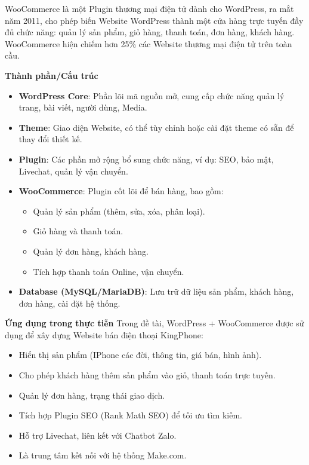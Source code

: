WooCommerce là một Plugin thương mại điện tử dành cho WordPress, ra mắt năm 2011, cho phép biến Website WordPress thành một cửa hàng trực tuyến đầy đủ chức năng: quản lý sản phẩm, giỏ hàng, thanh toán, đơn hàng, khách hàng. WooCommerce hiện chiếm hơn 25\% các Website thương mại điện tử trên toàn cầu.

\textbf{Thành phần/Cấu trúc}
\begin{itemize}
    \item \textbf{WordPress Core}: Phần lõi mã nguồn mở, cung cấp chức năng quản lý trang, bài viết, người dùng, Media.
    \item \textbf{Theme}: Giao diện Website, có thể tùy chỉnh hoặc cài đặt theme có sẵn để thay đổi thiết kế.
    \item \textbf{Plugin}: Các phần mở rộng bổ sung chức năng, ví dụ: SEO, bảo mật, Livechat, quản lý vận chuyển.
    \item \textbf{WooCommerce}: Plugin cốt lõi để bán hàng, bao gồm:
    \begin{itemize}
        \item Quản lý sản phẩm (thêm, sửa, xóa, phân loại).
        \item Giỏ hàng và thanh toán.
        \item Quản lý đơn hàng, khách hàng.
        \item Tích hợp thanh toán Online, vận chuyển.
    \end{itemize}
    \item \textbf{Database (MySQL/MariaDB)}: Lưu trữ dữ liệu sản phẩm, khách hàng, đơn hàng, cài đặt hệ thống.
\end{itemize}

\textbf{Ứng dụng trong thực tiễn}
Trong đề tài, WordPress + WooCommerce được sử dụng để xây dựng Website bán điện thoại KingPhone:
\begin{itemize}
    \item Hiển thị sản phẩm (IPhone các đời, thông tin, giá bán, hình ảnh).
    \item Cho phép khách hàng thêm sản phẩm vào giỏ, thanh toán trực tuyến.
    \item Quản lý đơn hàng, trạng thái giao dịch.
    \item Tích hợp Plugin SEO (Rank Math SEO) để tối ưu tìm kiếm.
    \item Hỗ trợ Livechat, liên kết với Chatbot Zalo.
    \item Là trung tâm kết nối với hệ thống Make.com.
\end{itemize}


